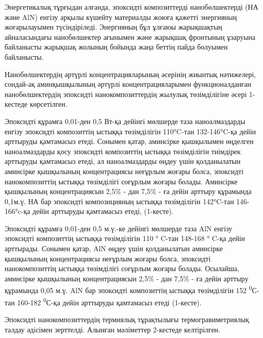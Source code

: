 \begin{multicols}{2}
Энергетикалық тұрғыдан алғанда, эпоксидті композиттерді нанобөлшектерді
(НА және AlN) енгізу арқылы күшейту материалды жоюға қажетті энергияның
жоғарылауымен түсіндіріледі. Энергияның бұл ұлғаюы жарықшақтың
айналасындағы нанобөлшектер ағынымен және жарықшақ фронтының ұзаруына
байланысты жарықшақ жолының бойында жаңа беттің пайда болуымен
байланысты.

Нанобөлшектердің әртүрлі концентрацияларының әсерінің жиынтық
нәтижелері, сондай-ақ аминқышқылының әртүрлі концентрацияларымен
функционалданған нанобөлшектердің эпоксидті нанокомпозиттердің жылулық
төзімділігіне әсері 1-кестеде көрсетілген.

Эпоксидті құрамға 0,01-ден 0,5 Вт-қа дейінгі мөлшерде таза
наноалмаздарды енгізу эпоксидті композиттің ыстыққа төзімділігін
110°C-тан 132-146°C-қа дейін арттыруды қамтамасыз етеді. Сонымен қатар,
аминсірке қышқылымен өңделген наноалмаздарды қосу эпоксидті композиттің
ыстыққа төзімділігін тиімдірек арттыруды қамтамасыз етеді, ал
наноалмаздарды өңдеу үшін қолданылатын аминсірке қышқылының
концентрациясы неғұрлым жоғары болса, эпоксидті нанокомпозиттің ыстыққа
төзімділігі соғұрлым жоғары болады. Аминсірке қышқылының концентрациясын
2,5\% - дан 7,5\% - ға дейін арттыру құрамында 0,1м.ү. НА бар эпоксидті
композицияның ыстыққа төзімділігін 142°C-тан 146-166°c-қа дейін
арттыруды қамтамасыз етеді, (1-кесте).

Эпоксидті құрамға 0,01-ден 0,5 м.ү.-ке дейінгі мөлшерде таза AlN енгізу
эпоксидті композиттің ыстыққа төзімділігін 110 ° C-тан 148-168 ° C-қа
дейін арттырады. Сонымен қатар, AlN өңдеу үшін қолданылатын аминсірке
қышқылының концентрациясы неғұрлым жоғары болса, эпоксидті
нанокомпозиттің ыстыққа төзімділігі соғұрлым жоғары болады. Осылайша,
аминсірке қышқылының концентрациясын 2,5\% - дан 7,5\% - ға дейін
арттыру құрамында 0,05 м.ү. AlN бар эпоксидті композиттің ыстыққа
төзімділігін 152 \textsuperscript{0}С-тан 160-182
\textsuperscript{0}С-қа дейін арттыруды қамтамасыз етеді (1-кесте).

Эпоксидті нанокомпозиттердің термиялық тұрақтылығы термогравиметриялық
талдау әдісімен зерттелді. Алынған мәліметтер 2-кестеде келтірілген.
\end{multicols}


